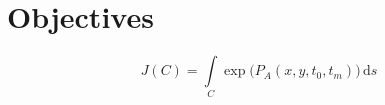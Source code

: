 


\chapter{Objectives}

\label{chapter:introduction}

\begin{equation}
    J(C) = \int \limits_{C} \exp{\Big(P_A(x, y, t_0, t_m)\Big)} \, \mathrm{d}s
\end{equation}


